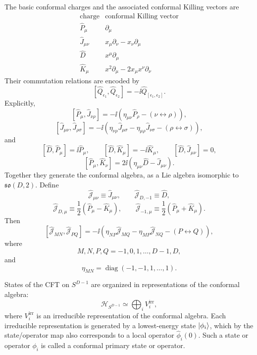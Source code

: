 The basic conformal charges and the associated conformal Killing
vectors are
\[
\begin{array}{c|c}
  \text{charge} & \text{conformal Killing vector} \\
  \hline
  \widehat P_\mu & \partial_\mu \\
  \widehat J_{\mu\nu} & x_\mu\partial_\nu-x_\nu\partial_\mu \\
  \widehat D & x^\mu\partial_\mu \\
  \widehat K_\mu & x^2\partial_\mu-2x_\mu x^\nu\partial_\nu
\end{array}
\]
Their commutation relations are encoded by
\[
  [\widehat Q_{\epsilon_1},\widehat Q_{\epsilon_2}]
  =
  -\ii \widehat Q_{[\epsilon_1,\epsilon_2]} .
\]
Explicitly,
\[
  [\widehat P_\mu,\widehat J_{\nu\rho}]
  =
  -\ii\left(
    \eta_{\mu\nu}\widehat P_\rho
    -(\nu\leftrightarrow\rho)
  \right),
\]
\[
  [\widehat J_{\mu\nu},\widehat J_{\rho\sigma}]
  =
  -\ii\left(
    \eta_{\nu\rho}\widehat J_{\mu\sigma}
    -
    \eta_{\mu\rho}\widehat J_{\nu\sigma}
    -(\rho\leftrightarrow\sigma)
  \right),
\]
and
\[
  [\widehat D,\widehat P_\mu]=\ii\widehat P_\mu,\qquad
  [\widehat D,\widehat K_\mu]=-\ii\widehat K_\mu,\qquad
  [\widehat D,\widehat J_{\mu\nu}]=0,
\]
\[
  [\widehat P_\mu,\widehat K_\nu]
  =
  2\ii\left(
    \eta_{\mu\nu}\widehat D-\widehat J_{\mu\nu}
  \right).
\]
Together they generate the conformal algebra, as a Lie algebra
isomorphic to \(\mathfrak{so}(D,2)\).  Define
\[
  \widehat{\mathcal J}_{\mu\nu}
  \equiv
  \widehat J_{\mu\nu},
  \qquad
  \widehat{\mathcal J}_{D,-1}
  \equiv
  \widehat D,
\]
\[
  \widehat{\mathcal J}_{D,\mu}
  \equiv
  \frac12(\widehat P_\mu-\widehat K_\mu),
  \qquad
  \widehat{\mathcal J}_{-1,\mu}
  \equiv
  \frac12(\widehat P_\mu+\widehat K_\mu).
\]
Then
\[
  [\widehat{\mathcal J}_{MN},\widehat{\mathcal J}_{PQ}]
  =
  -\ii\left(
    \eta_{NP}\widehat{\mathcal J}_{MQ}
    -
    \eta_{MP}\widehat{\mathcal J}_{NQ}
    -(P\leftrightarrow Q)
  \right),
\]
where
\[
  M,N,P,Q=-1,0,1,\ldots,D-1,D,
\]
and
\[
  \eta_{MN}=\operatorname{diag}(-1,-1,1,\ldots,1).
\]

States of the CFT on \(S^{D-1}\) are organized in representations of the
conformal algebra:
\[
  \mathcal H_{S^{D-1}}
  \simeq
  \bigoplus_i V_i^{\mathrm{irr}},
\]
where \(V_i^{\mathrm{irr}}\) is an irreducible representation of the
conformal algebra.  Each irreducible representation is generated by a
lowest-energy state \(\ket{\phi_i}\), which by the state/operator map
also corresponds to a local operator \(\widehat\phi_i(0)\).  Such a state
or operator \(\phi_i\) is called a conformal primary state or operator.


